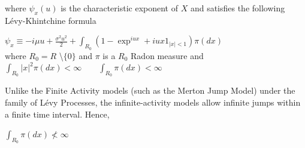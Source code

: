 \documentclass[12pt]{article}
\theoremstyle{definition}
\begin{document}
\justify where $\psi_{x}(u)$ is the characteristic exponent of $X$ and satisfies the following L\'{e}vy-Khintchine formula \citep{cont2004financial}
\begin{center}
$\psi_{x}\equiv -i\mu u + \frac{\sigma^{2}u^{2}}{2} + \int_{R_{0}} (1-\exp^{iux}+iux1_{|x|<1})\pi (dx) $\\
where $R_{0} = R$ \textbackslash $\{0\}$ and $\pi$ is a $R_{0}$ Radon measure and \\
$\int_{R_{0}} |x|^{2} \pi (dx)< \infty \qquad \int_{R_{0}} \pi (dx) < \infty$
\end{center}

Unlike the Finite Activity models (such as the Merton Jump Model) under the family of L\'{e}vy Processes, the infinite-activity models allow infinite jumps within a finite time interval. Hence,
\begin{center}
$\int_{R_{0}} \pi (dx) \not< \infty$
\end{center}
\end{document}
